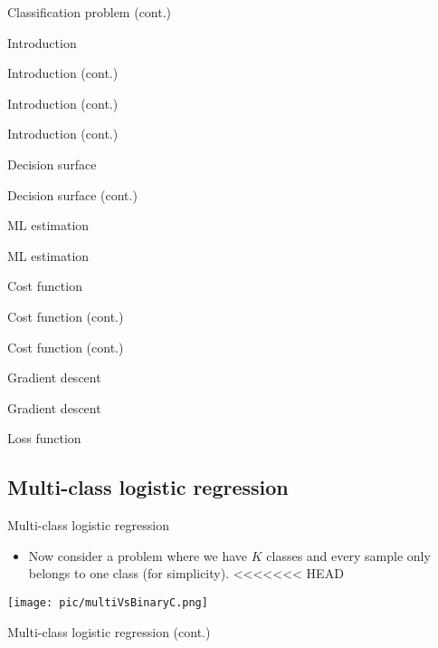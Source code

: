 \documentclass[serif, aspectratio=169]{beamer}
\begin{document}
\begin{frame}{Classification problem (cont.)}
\begin{itemize}
\begin{frame}{Introduction}
\begin{itemize}
\begin{frame}{Introduction (cont.)}
\begin{frame}{Introduction (cont.)}
\begin{frame}{Introduction (cont.)}
\begin{frame}{Decision surface}
\begin{itemize}
\begin{frame}{Decision surface (cont.)}
\begin{frame}{ML estimation}
\begin{frame}{ML estimation}
\begin{itemize}
\begin{frame}{Cost function}
\begin{frame}{Cost function (cont.)}
\begin{itemize}
\begin{itemize}
\begin{frame}{Cost function (cont.)}
\begin{frame}{Gradient descent}
\begin{frame}{Gradient descent}
\begin{frame}{Loss function}
\subsection{Multi-class logistic regression}
\begin{frame}{Multi-class logistic regression}
    \begin{itemize}
        \item Now consider a problem where we have $K$ classes and every sample only belongs to one class (for simplicity).
<<<<<<< HEAD
    \end{itemize}
    \centering
    \texttt{[image: pic/multiVsBinaryC.png]}
\end{frame}
\begin{frame}{Multi-class logistic regression (cont.)}
    \begin{itemize}

\end{itemize}
\end{frame}
\end{frame}
\end{frame}
\end{frame}
\end{frame}
\end{itemize}
\end{itemize}
\end{frame}
\end{frame}
\end{itemize}
\end{frame}
\end{frame}
\end{frame}
\end{itemize}
\end{frame}
\end{frame}
\end{frame}
\end{frame}
\end{itemize}
\end{frame}
\end{itemize}
\end{frame}
\end{document}
